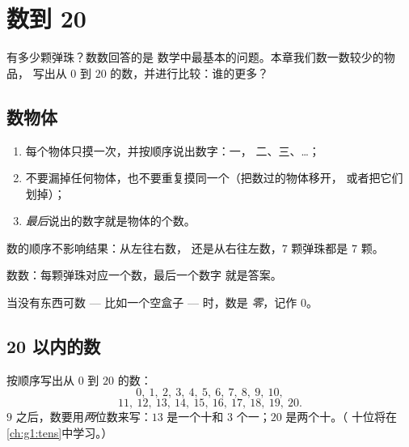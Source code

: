  \chapter{数到 20}\label{ch:g1:counting}

 有多少颗弹珠？数数回答的是
数学中最基本的问题。本章我们数一数较少的物品，
写出从 $0$ 到 $20$ 的数，并进行比较：谁的更多？

 \section{数物体}

 \begin{method}[怎样数数]\label{met:g1:counting:how}
\begin{enumerate}
  \item 每个物体只摸一次，并按顺序说出数字：一，
        二、三、\dots；
  \item 不要漏掉任何物体，也不要重复摸同一个（把数过的物体移开，
        或者把它们划掉）；
  \item \emph{最后}说出的数字就是物体的个数。
\end{enumerate}
数的顺序不影响结果：从左往右数，
还是从右往左数，$7$ 颗弹珠都是 $7$ 颗。
\end{method}

\begin{omfigure}

{\small 数数：每颗弹珠对应一个数，最后一个数字
就是答案。}
\end{omfigure}

\begin{definition}[零]\label{def:g1:counting:zero}
当没有东西可数 --- 比如一个空盒子 --- 时，数是
\emph{零}，记作 $0$。
\end{definition}

 \section{20 以内的数}

\begin{example}[读数与写数]\label{ex:g1:counting:writing}
按顺序写出从 $0$ 到 $20$ 的数：
\[
0,\ 1,\ 2,\ 3,\ 4,\ 5,\ 6,\ 7,\ 8,\ 9,\ 10,
\]
\[
11,\ 12,\ 13,\ 14,\ 15,\ 16,\ 17,\ 18,\ 19,\ 20 .
\]
$9$ 之后，数要用\emph{两}位数来写：$13$ 是一个十和
$3$ 个一；$20$ 是两个十。（
十位将在\cref{ch:g1:tens}中学习。）
\end{example}

